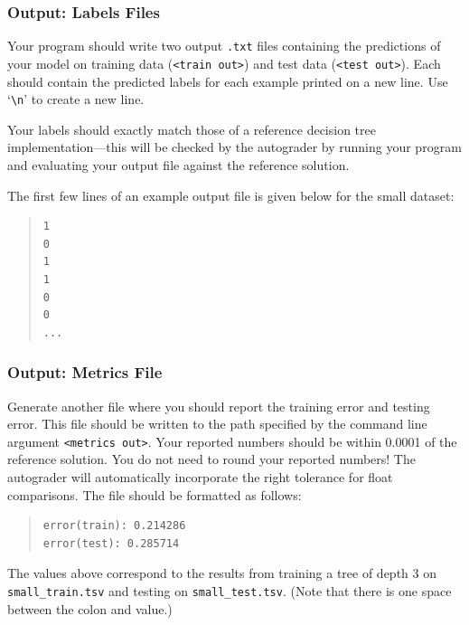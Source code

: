 \documentclass[11pt,addpoints,answers]{exam}
\begin{document}
\subsubsection{Output: Labels Files}
\label{sec:labels}

Your program should write two output \lstinline{.txt} files containing the predictions of your model on training data (\lstinline{<train out>}) and test data (\lstinline{<test out>}). Each should contain the predicted labels for each example printed on a new line. Use `\texttt{\textbackslash n}' to create a new line.

Your labels should exactly match those of a reference decision tree implementation---this will be checked by the autograder by running your program and evaluating your output file against the reference solution.

%
The first few lines of an example output file is given below for the small dataset:
\begin{quote}
\begin{verbatim}
1
0
1
1
0
0
...
\end{verbatim}
\end{quote}

\subsubsection{Output: Metrics File}
\label{sec:metrics}

Generate another file where you should report the training error and testing error. This file should be written to the path specified by the command line argument \lstinline{<metrics out>}. Your reported numbers should be within 0.0001 of the reference solution. You do not need to round your reported numbers! The autograder will automatically incorporate the right tolerance for float comparisons. The file should be formatted as follows:

\begin{quote}
\begin{verbatim}
error(train): 0.214286
error(test): 0.285714
\end{verbatim}
\end{quote}

The values above correspond to the results from training a tree of depth 3 on \texttt{small\_train.tsv} and testing on \texttt{small\_test.tsv}. (Note that there is one space between the colon and value.)
\end{document}
